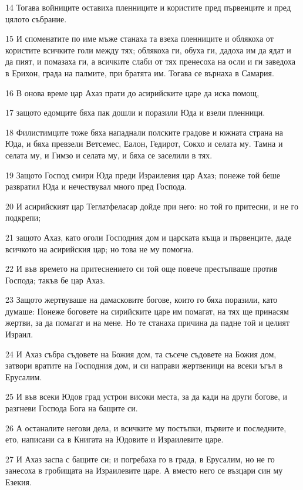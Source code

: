 \par 14 Тогава войниците оставиха пленниците и користите пред първенците и пред цялото събрание.
\par 15 И споменатите по име мъже станаха та взеха пленниците и облякоха от користите всичките голи между тях; облякоха ги, обуха ги, дадоха им да ядат и да пият, и помазаха ги, а всичките слаби от тях пренесоха на осли и ги заведоха в Ерихон, града на палмите, при братята им. Тогава се върнаха в Самария.
\par 16 В онова време цар Ахаз прати до асирийските царе да иска помощ,
\par 17 защото едомците бяха пак дошли и поразили Юда и взели пленници.
\par 18 Филистимците тоже бяха нападнали полските градове и южната страна на Юда, и бяха превзели Ветсемес, Еалон, Гедирот, Сокхо и селата му. Тамна и селата му, и Гимзо и селата му, и бяха се заселили в тях.
\par 19 Защото Господ смири Юда преди Израилевия цар Ахаз; понеже той беше развратил Юда и нечествувал много пред Господа.
\par 20 И асирийският цар Теглатфеласар дойде при него: но той го притесни, и не го подкрепи;
\par 21 защото Ахаз, като оголи Господния дом и царската къща и първенците, даде всичкото на асирийския цар; но това не му помогна.
\par 22 И във времето на притеснението си той още повече престъпваше против Господа; такъв бе цар Ахаз.
\par 23 Защото жертвуваше на дамасковите богове, които го бяха поразили, като думаше: Понеже боговете на сирийските царе им помагат, на тях ще принасям жертви, за да помагат и на мене. Но те станаха причина да падне той и целият Израил.
\par 24 И Ахаз събра съдовете на Божия дом, та съсече съдовете на Божия дом, затвори вратите на Господния дом, и си направи жертвеници на всеки ъгъл в Ерусалим.
\par 25 И във всеки Юдов град устрои високи места, за да кади на други богове, и разгневи Господа Бога на бащите си.
\par 26 А останалите негови дела, и всичките му постъпки, първите и последните, ето, написани са в Книгата на Юдовите и Израилевите царе.
\par 27 И Ахаз заспа с бащите си; и погребаха го в града, в Ерусалим, но не го занесоха в гробищата на Израилевите царе. А вместо него се възцари син му Езекия.

